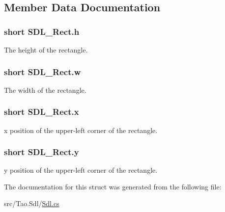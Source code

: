 \subsection{Member Data Documentation}
\hypertarget{struct_s_d_l___rect_ae91e0942999f1cae9195250aed976df9}{
\subsubsection[{h}]{\setlength{\rightskip}{0pt plus 5cm}short {\bf SDL\_\-Rect.h}}}
\label{struct_s_d_l___rect_ae91e0942999f1cae9195250aed976df9}


The height of the rectangle. 

\hypertarget{struct_s_d_l___rect_ab518d01dcd4fbe7b2fa7d8e1e3673eb9}{
\subsubsection[{w}]{\setlength{\rightskip}{0pt plus 5cm}short {\bf SDL\_\-Rect.w}}}
\label{struct_s_d_l___rect_ab518d01dcd4fbe7b2fa7d8e1e3673eb9}


The width of the rectangle. 

\hypertarget{struct_s_d_l___rect_a1efa4d3799ed735ca60655d32d01b4a3}{
\subsubsection[{x}]{\setlength{\rightskip}{0pt plus 5cm}short {\bf SDL\_\-Rect.x}}}
\label{struct_s_d_l___rect_a1efa4d3799ed735ca60655d32d01b4a3}


x position of the upper-\/left corner of the rectangle. 

\hypertarget{struct_s_d_l___rect_a5be726a205a1d331cd4905b6de6ccc39}{
\subsubsection[{y}]{\setlength{\rightskip}{0pt plus 5cm}short {\bf SDL\_\-Rect.y}}}
\label{struct_s_d_l___rect_a5be726a205a1d331cd4905b6de6ccc39}


y position of the upper-\/left corner of the rectangle. 



The documentation for this struct was generated from the following file:\begin{DoxyCompactItemize}
\item 
src/Tao.Sdl/\hyperlink{_sdl_8cs}{Sdl.cs}\end{DoxyCompactItemize}
